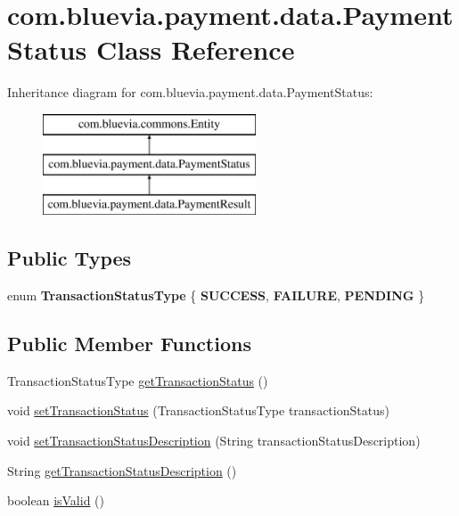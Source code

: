 \hypertarget{classcom_1_1bluevia_1_1payment_1_1data_1_1PaymentStatus}{
\section{com.bluevia.payment.data.PaymentStatus Class Reference}
\label{classcom_1_1bluevia_1_1payment_1_1data_1_1PaymentStatus}
}
Inheritance diagram for com.bluevia.payment.data.PaymentStatus:\begin{figure}[H]
\begin{center}
\leavevmode
\includegraphics[height=3.000000cm]{classcom_1_1bluevia_1_1payment_1_1data_1_1PaymentStatus}
\end{center}
\end{figure}
\subsection*{Public Types}
\begin{DoxyCompactItemize}
\item 
enum {\bfseries TransactionStatusType} \{ {\bfseries SUCCESS}, 
{\bfseries FAILURE}, 
{\bfseries PENDING}
 \}
\end{DoxyCompactItemize}
\subsection*{Public Member Functions}
\begin{DoxyCompactItemize}
\item 
TransactionStatusType \hyperlink{classcom_1_1bluevia_1_1payment_1_1data_1_1PaymentStatus_a7fecbecfc30326e6193b21a34edf6256}{getTransactionStatus} ()
\item 
void \hyperlink{classcom_1_1bluevia_1_1payment_1_1data_1_1PaymentStatus_a78ec9398e636b736bceaa59a44036295}{setTransactionStatus} (TransactionStatusType transactionStatus)
\item 
void \hyperlink{classcom_1_1bluevia_1_1payment_1_1data_1_1PaymentStatus_a6b3e1b6c6bf95ba76cf898066dd1275d}{setTransactionStatusDescription} (String transactionStatusDescription)
\item 
String \hyperlink{classcom_1_1bluevia_1_1payment_1_1data_1_1PaymentStatus_a24221d9c22c272938219ef108591e64d}{getTransactionStatusDescription} ()
\item 
boolean \hyperlink{classcom_1_1bluevia_1_1payment_1_1data_1_1PaymentStatus_acf7b890f0100827e6bebfe2f6f53e6a8}{isValid} ()
\end{DoxyCompactItemize}
